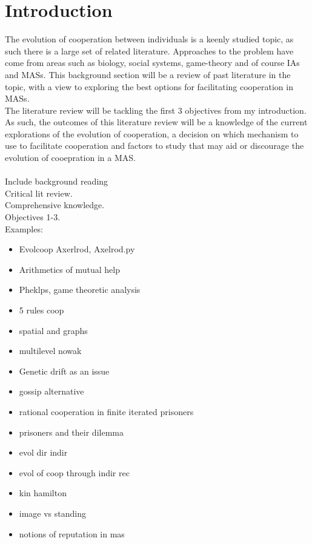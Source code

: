 \documentclass[]{final_report}
\begin{document}
\section{Introduction}
The evolution of cooperation between individuals is a keenly studied topic, as such there is a large set of related literature. Approaches to the problem have come from areas such as biology, social systems, game-theory and of course IAs and MASs. This background section will be a review of past literature in the topic, with a view to exploring the best options for facilitating cooperation in MASs.\\
The literature review will be tackling the first 3 objectives from my introduction. As such, the outcomes of this literature review will be a knowledge of the current explorations of the evolution of cooperation, a decision on which mechanism to use to facilitate cooperation and factors to study that may aid or discourage the evolution of cooepration in a MAS.\\
\\
Include background reading\\
Critical lit review.\\
Comprehensive knowledge.\\
Objectives 1-3.\\
Examples:
\begin{itemize}
	\item Evolcoop Axerlrod, Axelrod.py
	\item Arithmetics of mutual help
	\item Pheklps, game theoretic analysis
	\item 5 rules coop
	\item spatial and graphs
	\item multilevel nowak
	\item Genetic drift as an issue
	\item gossip alternative
	\item rational cooperation in finite iterated prisoners
	\item prisoners and their dilemma
	\item evol dir indir
	\item evol of coop through indir rec
	\item kin hamilton
	\item image vs standing
	\item notions of reputation in mas
\end{itemize}
\end{document}
